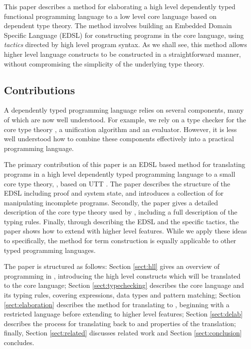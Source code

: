 This paper describes a method for elaborating a high level dependently typed
functional programming language to a low level core language based on dependent
type theory.  The method involves building an Embedded Domain Specific Language
(EDSL) for constructing programs in the core language, using \emph{tactics}
directed by high level program syntax.  
As we shall see, this method allows higher level language constructs to be
constructed in a straightforward manner, without compromising the simplicity
of the underlying type theory.

\subsection{Contributions}

A dependently typed programming language relies on several components, many of
which are now well understood. For example, we rely on a type checker for
the core type theory \cite{Chapman2005epigram,loh2010tutorial}, a
unification algorithm \cite{Miller1992} and an evaluator. However, it is less
well understood how to combine these components effectively into a practical
programming language. 

The primary contribution of this paper is
an EDSL based method for translating programs in a
high level dependently typed programming language to a small core type theory,
\TT{}, based on UTT \cite{luo1994}. The paper describes the structure of the
EDSL including proof and system state, and introduces a collection of 
for manipulating incomplete programs.
Secondly, the paper gives a detailed description of the core type theory used
by \Idris{}, including a full description of the typing rules. Finally, through
describing the EDSL and the specific tactics, the paper shows how to extend
\Idris{} with higher level features.
While we apply these ideas to \Idris{} specifically, the method for term construction
is equally applicable to other typed programming languages.

The paper is structured as follows: Section \ref{sect:hll} gives an overview of
programming in \Idris{}, introducing the high level constructs which will be
translated to the core language; Section \ref{sect:typechecking} describes the
core language \TT{} and its typing rules, covering expressions, data types
and pattern matching; Section \ref{sect:elaboration} describes the method
for translating \Idris{} to \TT{}, beginning with a restricted language
\IdrisM{} before extending to higher level features; Section
\ref{sect:delab} describes the process for translating back to \Idris{}
and properties of the translation; finally, 
Section \ref{sect:related} discusses related work and Section \ref{sect:conclusion}
concludes.

